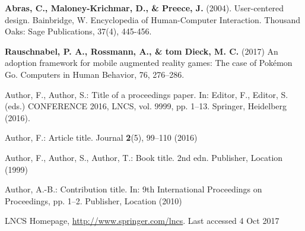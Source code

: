 \documentclass[runningheads]{llncs}
\begin{document}
\begin{thebibliography}{8}
 \textbf{Abras, C., Maloney-Krichmar, D., \& Preece, J.} (2004). User-centered design. Bainbridge, W. Encyclopedia of Human-Computer Interaction. Thousand Oaks: Sage Publications, 37(4), 445-456.

 \textbf{Rauschnabel, P. A., Rossmann, A., \& tom Dieck, M. C.} (2017) An adoption framework for mobile augmented reality games: The case of Pokémon Go. Computers in Human Behavior, 76, 276–286. 

Author, F., Author, S.: Title of a proceedings paper. In: Editor,
F., Editor, S. (eds.) CONFERENCE 2016, LNCS, vol. 9999, pp. 1--13.
Springer, Heidelberg (2016). 

Author, F.: Article title. Journal \textbf{2}(5), 99--110 (2016)

Author, F., Author, S., Author, T.: Book title. 2nd edn. Publisher,
Location (1999)

Author, A.-B.: Contribution title. In: 9th International Proceedings
on Proceedings, pp. 1--2. Publisher, Location (2010)

LNCS Homepage, \url{http://www.springer.com/lncs}. Last accessed 4
Oct 2017
\end{thebibliography}
\end{document}
